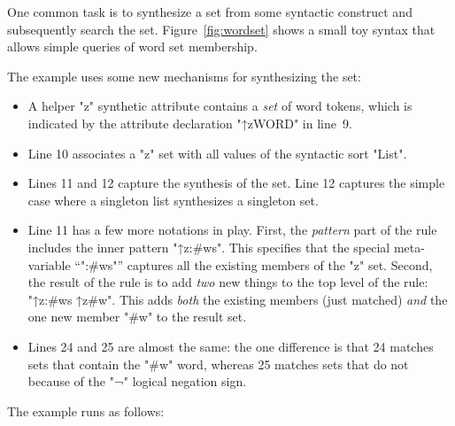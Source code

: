 \documentclass[11pt]{article} %
\begin{document}
\begin{example}
  One common task is to synthesize a set from some syntactic construct and subsequently search the
  set. Figure~\ref{fig:wordset} shows a small toy syntax that allows simple queries of word set
  membership.

  The example uses some new mechanisms for synthesizing the set:
  \begin{itemize}

  \item A helper "z" synthetic attribute contains a \emph{set} of word tokens, which is indicated by
    the attribute declaration "↑z{WORD}" in line~9.

  \item Line 10 associates a "z" set with all values of the syntactic sort "List".

  \item Lines 11 and 12 capture the synthesis of the set. Line 12 captures the simple case where a
    singleton list synthesizes a singleton set.

  \item Line 11 has a few more notations in play.  First, the \emph{pattern} part of the rule
    includes the inner pattern "↑z{:#ws}". This specifies that the special meta-variable ``":#ws"''
    captures all the existing members of the "z" set.  Second, the result of the rule is to add
    \emph{two} new things to the top level of the rule: "↑z{:#ws} ↑z{#w}". This adds \emph{both} the
    existing members (just matched) \emph{and} the one new member "#w" to the result set.

  \item Lines 24 and 25 are almost the same: the one difference is that 24 matches sets that contain
    the "#w" word, whereas 25 matches sets that do not because of the "¬" logical negation sign.
  \end{itemize}
  The example runs as follows:
\end{example}
\end{document}
